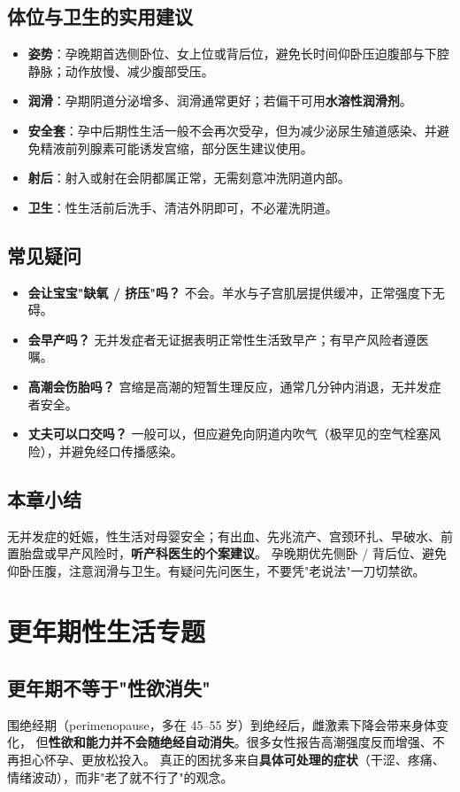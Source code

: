 \section{体位与卫生的实用建议}
\begin{itemize}
  \item \textbf{姿势}：孕晚期首选侧卧位、女上位或背后位，避免长时间仰卧压迫腹部与下腔静脉；动作放慢、减少腹部受压。
  \item \textbf{润滑}：孕期阴道分泌增多、润滑通常更好；若偏干可用\textbf{水溶性润滑剂}。
  \item \textbf{安全套}：孕中后期性生活一般不会再次受孕，但为减少泌尿生殖道感染、并避免精液前列腺素可能诱发宫缩，部分医生建议使用。
  \item \textbf{射后}：射入或射在会阴都属正常，无需刻意冲洗阴道内部。
  \item \textbf{卫生}：性生活前后洗手、清洁外阴即可，不必灌洗阴道。
\end{itemize}

\section{常见疑问}
\begin{itemize}
  \item \textbf{会让宝宝"缺氧 / 挤压"吗？} 不会。羊水与子宫肌层提供缓冲，正常强度下无碍。
  \item \textbf{会早产吗？} 无并发症者无证据表明正常性生活致早产；有早产风险者遵医嘱。
  \item \textbf{高潮会伤胎吗？} 宫缩是高潮的短暂生理反应，通常几分钟内消退，无并发症者安全。
  \item \textbf{丈夫可以口交吗？} 一般可以，但应避免向阴道内吹气（极罕见的空气栓塞风险），并避免经口传播感染。
\end{itemize}

\section{本章小结}
无并发症的妊娠，性生活对母婴安全；有出血、先兆流产、宫颈环扎、早破水、前置胎盘或早产风险时，\textbf{听产科医生的个案建议}。
孕晚期优先侧卧 / 背后位、避免仰卧压腹，注意润滑与卫生。有疑问先问医生，不要凭"老说法"一刀切禁欲。


\chapter{更年期性生活专题}

\section{更年期不等于"性欲消失"}
围绝经期（perimenopause，多在 45--55 岁）到绝经后，雌激素下降会带来身体变化，
但\textbf{性欲和能力并不会随绝经自动消失}。很多女性报告高潮强度反而增强、不再担心怀孕、更放松投入。
真正的困扰多来自\textbf{具体可处理的症状}（干涩、疼痛、情绪波动），而非"老了就不行了"的观念。

